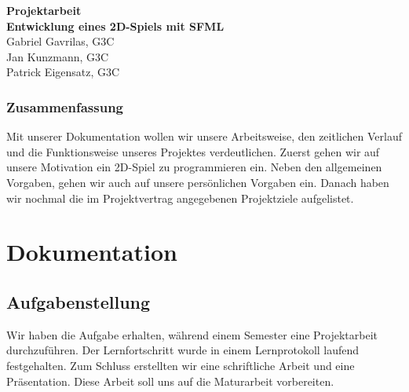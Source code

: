 \documentclass[11pt,a4paper]{scrbook}
\begin{document}
\begin{titlepage}
\begin{center}

\vspace*{3cm}
\textbf{\huge{Projektarbeit}}\\
\vspace*{2cm}
\textbf{\large{Entwicklung eines 2D-Spiels mit SFML}}\\
\vspace*{5cm}
Gabriel Gavrilas, G3C\\
Jan Kunzmann, G3C\\
Patrick Eigensatz, G3C
\end{center}
\end{titlepage}


\clearpage
\thispagestyle{empty}


\section*{Zusammenfassung}
Mit unserer Dokumentation wollen wir unsere Arbeitsweise, den zeitlichen Verlauf und die Funktionsweise unseres Projektes verdeutlichen.
Zuerst gehen wir auf unsere Motivation ein 2D-Spiel zu programmieren ein.
Neben den allgemeinen Vorgaben, gehen wir auch auf unsere persönlichen Vorgaben ein.
Danach haben wir nochmal die im Projektvertrag angegebenen Projektziele aufgelistet.

 



\thispagestyle{empty}
\clearscrheadfoot
\lofoot[\pagemark]{\pagemark}
\thispagestyle{empty}
\tableofcontents

\clearpage
{}


\part{Dokumentation}
\chapter{Aufgabenstellung}
Wir haben die Aufgabe erhalten, während einem Semester eine Projektarbeit durchzuführen. Der Lernfortschritt wurde in einem Lernprotokoll laufend festgehalten.
Zum Schluss erstellten wir eine schriftliche Arbeit und eine Präsentation. Diese Arbeit soll uns auf die Maturarbeit vorbereiten.
\end{document}
